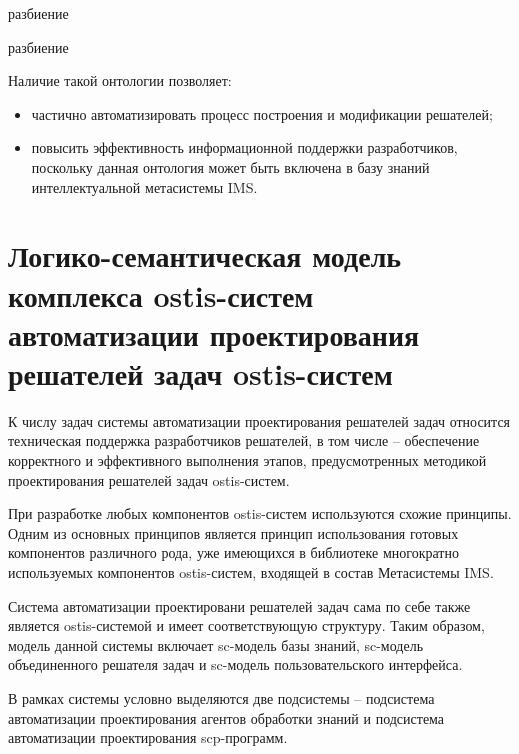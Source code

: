 \begin{SCn}
\begin{scnreltoset}{разбиение}
\end{scnreltoset}


\begin{scnreltoset}{разбиение}
\end{scnreltoset}
\end{SCn}

Наличие такой онтологии позволяет:
\begin{itemize}
    \item частично автоматизировать процесс построения и модификации решателей;
    \item повысить эффективность информационной поддержки разработчиков, поскольку данная онтология может быть включена в базу знаний интеллектуальной метасистемы IMS.
\end{itemize}

\section{Логико-семантическая модель комплекса ostis-систем автоматизации проектирования решателей задач ostis-систем}

К числу задач системы автоматизации проектирования решателей задач относится техническая поддержка разработчиков решателей, в том числе -- обеспечение корректного и эффективного выполнения этапов, предусмотренных методикой проектирования решателей задач ostis-систем.

При разработке любых компонентов ostis-систем используются схожие принципы. Одним из основных принципов является принцип использования готовых компонентов различного рода, уже имеющихся в библиотеке многократно используемых компонентов ostis-систем, входящей в состав Метасистемы IMS.

Система автоматизации проектировани решателей задач сама по себе также является ostis-системой и имеет соответствующую структуру. Таким образом, модель данной системы включает sc-модель базы знаний, sc-модель объединенного решателя задач и sc-модель пользовательского интерфейса.

В рамках системы условно выделяются две подсистемы -- подсистема автоматизации проектирования агентов обработки знаний и подсистема автоматизации проектирования scp-программ.


